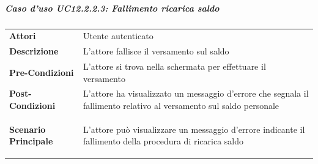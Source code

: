\subparagraph{Caso d'uso UC12.2.2.3: Fallimento ricarica saldo}
\label{UC12_2_2_3}
\begin{minipage}{\linewidth}
	\begin{tabular}{ l | p{11cm}}
		\hline
		\rowcolor{Gray}
		\multicolumn{2}{c}{UC12.2.2.3 - Fallimento ricarica saldo} \\
		\hline
		\textbf{Attori} & Utente autenticato \\
		\textbf{Descrizione} & L'attore fallisce il versamento sul saldo \\
		\textbf{Pre-Condizioni} & L'attore si trova nella schermata per effettuare il versamento\\
		\textbf{Post-Condizioni} & L'attore ha visualizzato un messaggio d'errore che segnala il fallimento relativo al versamento sul saldo personale \\
		\textbf{Scenario Principale} & 
		\begin{enumerate*}[label=(\arabic*.),itemjoin={\newline}]
			\item L'attore può visualizzare un messaggio d'errore indicante il fallimento della procedura di ricarica saldo 
		\end{enumerate*}\\
	\end{tabular}
\end{minipage}